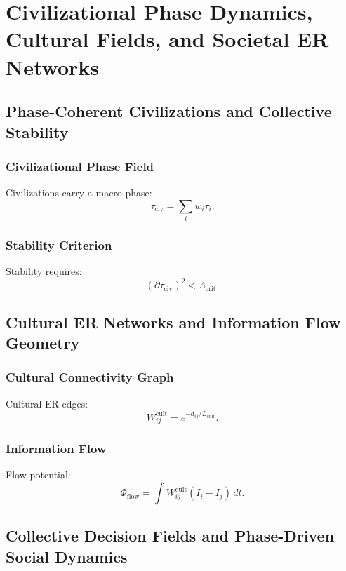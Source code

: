 

\part{Civilizational Phase Dynamics, Cultural Fields, and Societal ER Networks}

\chapter{Phase-Coherent Civilizations and Collective Stability}

\section{Civilizational Phase Field}
Civilizations carry a macro-phase:
\[
\tau_{\mathrm{civ}} = \sum_i w_i \tau_i.
\]

\section{Stability Criterion}
Stability requires:
\[
(\partial\tau_{\mathrm{civ}})^2 < \Lambda_{\mathrm{crit}}.
\]

\chapter{Cultural ER Networks and Information Flow Geometry}

\section{Cultural Connectivity Graph}
Cultural ER edges:
\[
W_{ij}^{\mathrm{cult}} = e^{-d_{ij}/L_{\mathrm{cult}}}.
\]

\section{Information Flow}
Flow potential:
\[
\Phi_{\mathrm{flow}} = \int W^{\mathrm{cult}}_{ij}(I_i - I_j)\,dt.
\]

\chapter{Collective Decision Fields and Phase-Driven Social Dynamics}

